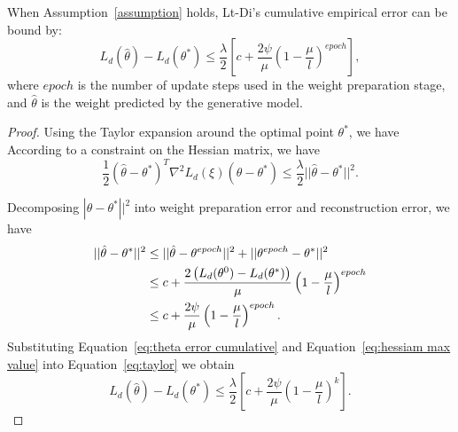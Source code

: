 \begin{theorem}\label{theorem:emperi error}
When Assumption~\ref{assumption} holds, Lt-Di's cumulative empirical error can be bound by:
$$
    L_d(\hat{\theta})-L_d(\theta^*) \leq \frac{\lambda}{2} \left[c+\frac{2\psi}{\mu}\left(1 - \frac{\mu}{l}\right)^{epoch}\right],
$$
where $epoch$ is the number of update steps used in the weight preparation stage, and $\hat{\theta}$ is the weight predicted by the generative model.
\end{theorem}

\begin{proof}
Using the Taylor expansion around the optimal point \( \theta^* \), we have\\
According to a constraint on the Hessian matrix, we have
\begin{equation}\label{eq:hessiam max value}
 \frac{1}{2} (\hat{\theta} - \theta^*)^T \nabla^2 L_d(\xi) (\hat{\theta} - \theta^*) \leq \frac{\lambda}{2}  ||\hat{\theta} - \theta^*||^2.
\end{equation}

Decomposing $|\hat{\theta} - \theta^*||^2$ into weight preparation error and reconstruction error, we have
\begin{align}\label{eq:theta error cumulative}
    ||\hat{\theta}-\theta^*||^2 &\leq ||\hat{\theta}-\theta^{epoch}||^2 + ||\theta^{epoch}-\theta^*||^2 \notag\\
&\leq c + \frac{2 \left(L_d(\theta^0) - L_d(\theta^*)\right)}{\mu} \left(1 - \frac{\mu}{l}\right)^{epoch} \notag\\
& \leq c + \frac{2 \psi}{\mu} \left(1 - \frac{\mu}{l}\right)^{epoch}.
\end{align}
Substituting Equation~\ref{eq:theta error cumulative} and Equation~\ref{eq:hessiam max value} into Equation~\ref{eq:taylor} we obtain
$$
    L_d(\hat{\theta})-L_d(\theta^*) \leq \frac{\lambda}{2} \left[c+\frac{2\psi}{\mu}\left(1 - \frac{\mu}{l}\right)^k\right].
$$
\end{proof}




